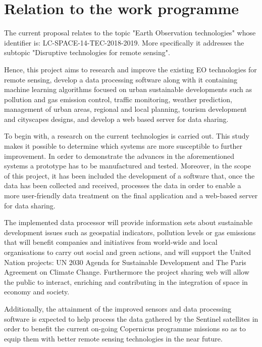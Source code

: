 \section{Relation to the work programme}
The current proposal relates to the topic "Earth Observation technologies" whose identifier is: LC-SPACE-14-TEC-2018-2019. More specifically it addresses the subtopic "Disruptive technologies for remote sensing". 

Hence, this project aims to research and improve the existing EO technologies for remote sensing, develop a data processing software along with it containing machine learning algorithms focused on urban sustainable developments such as pollution and gas emission control, traffic monitoring, weather prediction, management of urban areas, regional and local planning, tourism development and cityscapes designs, and develop a web based server for data sharing. 

To begin with, a research on the current technologies is carried out. This study makes it possible to determine which systems are more susceptible to further improvement. In order to demonstrate the advances in the aforementioned systems a prototype has to be manufactured and tested. Moreover, in the scope of this project, it has been included the development of a software that, once the data has been collected and received, processes the data in order to enable a more user-friendly data treatment on the final application and a web-based server for data sharing.

The implemented data processor will provide information sets about sustainable development issues such as geospatial indicators, pollution levels or gas emissions that will benefit companies and initiatives from world-wide and local organisations to carry out social and green actions, and will support the United Nation projects: UN 2030 Agenda for Sustainable Development and The Paris Agreement on Climate Change\cite{UN2030}. Furthermore the project sharing web will allow the public to interact, enriching and contributing in the integration of space in economy and society.
 
Additionally, the attainment of the improved sensors and data processing software is expected to help process the data gathered by the Sentinel satellites in order to benefit the current on-going Copernicus programme missions so as to equip them with better remote sensing technologies in the near future.  